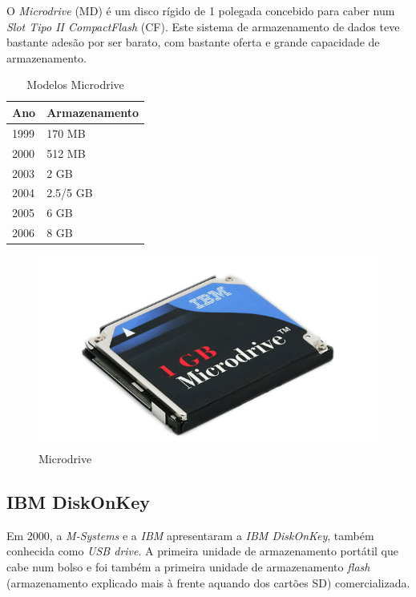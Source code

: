 \documentclass{report}
\begin{document}
	O \textit{Microdrive} (MD) é um disco rígido de 1 polegada concebido para caber num \textit{Slot Tipo II CompactFlash} (CF).
	Este sistema de armazenamento de dados teve bastante adesão por ser barato, com bastante oferta e grande capacidade de armazenamento. 
	
	\begin{table}[h]
		\centering
		\caption{Modelos Microdrive} 
		\vspace{2mm}
		\label{Tabela de Microdive}
		\begin{tabular}{|l|l|}
		\hline
		\textbf{Ano} & \textbf{Armazenamento} \\ \hline
			1999 & 170  MB \\ \hline
			2000 & 512  MB \\ \hline
			2003 & 2  GB \\ \hline
			2004 & 2.5/5  GB  \\ \hline
			2005 & 6  GB  \\ \hline
			2006 & 8  GB  \\ \hline
			\end{tabular}
		\end{table}
	
	\begin{figure} [h]
		\centering
		\includegraphics[scale=0.3]{microdrive.jpg}
		\caption{Microdrive}
	\end{figure}

\newpage

		
		
		\subsection{IBM DiskOnKey}
		
		
		Em 2000, a \textit{M-Systems} e a \textit{IBM} apresentaram a \textit{IBM DiskOnKey}, também conhecida como \textit{USB drive}. A primeira unidade de armazenamento portátil que cabe num bolso e foi também a primeira unidade de armazenamento \textit{flash}  (armazenamento explicado mais à frente aquando dos cartões SD) comercializada.
\vspace{3mm}		
		 
\end{document}
